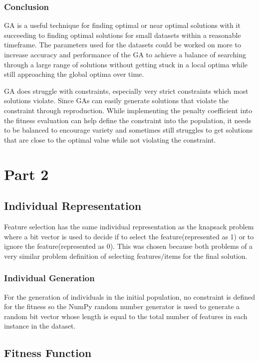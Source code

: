 \documentclass{article}
\begin{document}
\subsubsection*{Conclusion}
GA is a useful technique for finding optimal or near optimal solutions with it succeeding to finding optimal solutions for small datasets within a reasonable timeframe. The parameters used for the datasets could be worked on more to increase accuracy and performance of the GA to achieve a balance of searching through a large range of solutions without getting stuck in a local optima while still approaching the global optima over time. \par
\noindent GA does struggle with constraints, especially very strict constraints which most solutions violate. Since GAs can easily generate solutions that violate the constraint through reproduction. While implementing the penalty coefficient into the fitness evaluation can help define the constraint into the population, it needs to be balanced to encourage variety and sometimes still struggles to get solutions that are close to the optimal value while not violating the constraint. \par
\section*{Part 2}
\subsection*{Individual Representation}
Feature selection has the same individual representation as the knapsack problem where a bit vector is used to decide if to select the feature(represented as 1) or to ignore the feature(represented as 0). This was chosen because both problems of a very similar problem definition of selecting features/items for the final solution. \par
\subsubsection*{Individual Generation}
For the generation of individuals in the initial population, no constraint is defined for the fitness so the NumPy random number generator is used to generate a random bit vector whose length is equal to the total number of features in each instance in the dataset. \par
\subsection*{Fitness Function}
\end{document}

